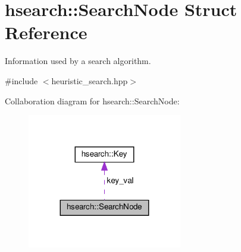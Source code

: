 \hypertarget{structhsearch_1_1SearchNode}{}\section{hsearch\+:\+:Search\+Node Struct Reference}
\label{structhsearch_1_1SearchNode}


Information used by a search algorithm.  




{\ttfamily \#include $<$heuristic\+\_\+search.\+hpp$>$}



Collaboration diagram for hsearch\+:\+:Search\+Node\+:\nopagebreak
\begin{figure}[H]
\begin{center}
\leavevmode
\includegraphics[width=191pt]{db/d43/structhsearch_1_1SearchNode__coll__graph}
\end{center}
\end{figure}
